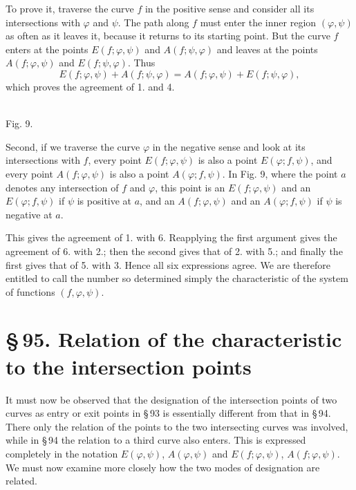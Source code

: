 \documentclass[11pt]{article}
\providecommand{\sect}[2]{\section*{\S\,#1. #2}}
\begin{document}
To prove it, traverse the curve $f$ in the positive sense and consider all its intersections with $\varphi$ and $\psi$. The path along $f$ must enter the inner region $(\varphi,\psi)$ as often as it leaves it, because it returns to its starting point. But the curve $f$ enters at the points $E(f;\varphi,\psi)$ and $A(f;\psi,\varphi)$ and leaves at the points $A(f;\varphi,\psi)$ and $E(f;\psi,\varphi)$. Thus
\[
E(f;\varphi,\psi)+A(f;\psi,\varphi)=A(f;\varphi,\psi)+E(f;\psi,\varphi),
\]
which proves the agreement of 1. and 4.


\begin{center}
\\[-0.2em]
{\small Fig. 9.}
\end{center}


Second, if we traverse the curve $\varphi$ in the negative sense and look at its intersections with $f$, every point $E(f;\varphi,\psi)$ is also a point $E(\varphi;f,\psi)$, and every point $A(f;\varphi,\psi)$ is also a point $A(\varphi;f,\psi)$. In Fig. 9, where the point $a$ denotes any intersection of $f$ and $\varphi$, this point is an $E(f;\varphi,\psi)$ and an $E(\varphi;f,\psi)$ if $\psi$ is positive at $a$, and an $A(f;\varphi,\psi)$ and an $A(\varphi;f,\psi)$ if $\psi$ is negative at $a$.

This gives the agreement of 1. with 6. Reapplying the first argument gives the agreement of 6. with 2.; then the second gives that of 2. with 5.; and finally the first gives that of 5. with 3. Hence all six expressions agree. We are therefore entitled to call the number so determined simply the characteristic of the system of functions $(f,\varphi,\psi)$.

\sect{95}{Relation of the characteristic to the intersection points}

It must now be observed that the designation of the intersection points of two curves as entry or exit points in \S\,93 is essentially different from that in \S\,94. There only the relation of the points to the two intersecting curves was involved, while in \S\,94 the relation to a third curve also enters. This is expressed completely in the notation $E(\varphi,\psi)$, $A(\varphi,\psi)$ and $E(f;\varphi,\psi)$, $A(f;\varphi,\psi)$. We must now examine more closely how the two modes of designation are related.
\end{document}
